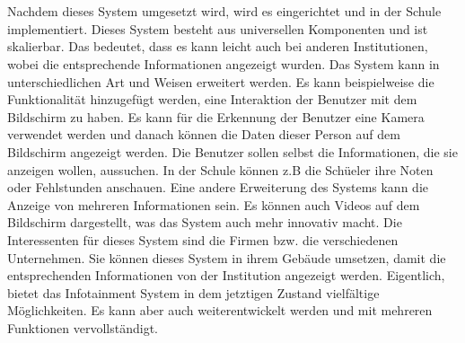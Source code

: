 \chapter{\docname}
\label{\docname}
Nachdem dieses System umgesetzt wird, wird es eingerichtet und in der Schule implementiert. Dieses System besteht aus universellen Komponenten und ist skalierbar. Das bedeutet, dass es kann leicht auch bei anderen Institutionen, wobei die entsprechende Informationen angezeigt wurden. 
Das System kann in unterschiedlichen Art und Weisen erweitert werden. Es kann beispielweise die Funktionalit\"at hinzugef\"ugt werden, eine Interaktion der Benutzer mit dem Bildschirm zu haben. Es kann f\"ur die Erkennung der Benutzer eine Kamera verwendet werden und danach k\"onnen die Daten dieser Person auf dem Bildschirm angezeigt werden. Die Benutzer sollen selbst die Informationen, die sie anzeigen wollen, aussuchen. In der Schule k\"onnen z.B die Sch\"ueler ihre Noten oder Fehlstunden anschauen. 
Eine andere Erweiterung des Systems kann die Anzeige von mehreren Informationen sein. Es k\"onnen auch Videos auf dem Bildschirm dargestellt, was das System auch mehr innovativ macht. 
Die Interessenten f\"ur dieses System sind die Firmen bzw. die verschiedenen Unternehmen. Sie k\"onnen dieses System in ihrem Geb\"aude umsetzen, damit die entsprechenden Informationen von der Institution angezeigt werden. 
Eigentlich, bietet das Infotainment System in dem jetztigen Zustand vielf\"altige M\"oglichkeiten. Es kann aber auch weiterentwickelt werden und mit mehreren Funktionen vervollst\"andigt.

